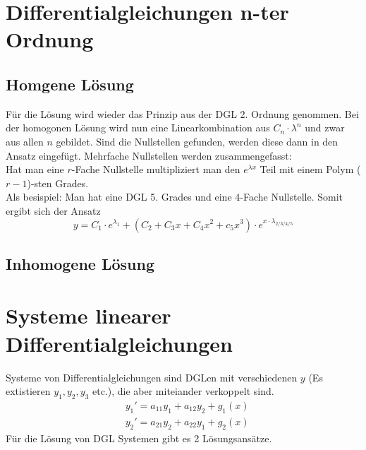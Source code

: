 \documentclass[a4paper,10pt]{scrartcl}
\begin{document}
        \section{Differentialgleichungen n-ter Ordnung}
        \subsection*{Homgene Lösung}
        
        Für die Lösung wird wieder das Prinzip aus der DGL 2. Ordnung genommen. Bei der homogonen Lösung wird nun eine Linearkombination aus \(C_n \cdot \lambda^n \) und 
        zwar aus allen \(n\) gebildet. Sind die Nullstellen gefunden, werden diese dann in den Ansatz eingefügt. Mehrfache Nullstellen werden zusammengefasst: \\
        Hat man eine \(r\)-Fache Nullstelle multipliziert man den \(e^{\lambda x}\) Teil mit einem Polym (\(r-1\))-sten Grades. \\
        Als besispiel: Man hat eine DGL 5. Grades und eine 4-Fache Nullstelle. Somit ergibt sich der Ansatz 
        \begin{equation}
            y = C_1 \cdot e^{\lambda_1} + (C_2 + C_3x + C_4x^2 + c_5x^3) \cdot e^{x \cdot \lambda_{2/3/4/5}}
        \end{equation}   

        \subsection*{Inhomogene Lösung}

        \section{Systeme linearer Differentialgleichungen}
        Systeme von Differentialgleichungen sind DGLen mit verschiedenen \(y\) (Es extistieren  \(y_1, y_2, y_3\) etc.), die aber miteiander verkoppelt sind.
        \begin{equation*}
            \begin{aligned}
                & y_1' = a_{11}y_1 + a_{12}y_2 + g_1(x) \\
                & y_2' = a_{21}y_2 + a_{22}y_1 + g_2(x)  
            \end{aligned}
        \end{equation*}
        Für die Lösung von DGL Systemen gibt es 2 Lösungsansätze.
\end{document}
